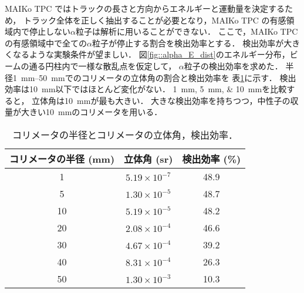 \documentclass[../master]{subfiles}
\begin{document}
MAIKo TPC ではトラックの長さと方向からエネルギーと運動量を決定するため，
トラック全体を正しく抽出することが必要となり，MAIKo TPC の有感領域内で停止しない$\alpha$粒子は解析に用いることができない．
ここで，MAIKo TPC の有感領域中で全ての$\alpha$粒子が停止する割合を検出効率とする．
検出効率が大きくなるような実験条件が望ましい．
図\ref{fig::alpha_E_dist}のエネルギー分布，ビームの通る円柱内で一様な散乱点を仮定して，
$\alpha$粒子の検出効率を求めた．
半径\SIrange{1}{50}{\milli\metre}でのコリメータの立体角の割合と検出効率を
表\ref{tab::solid_angle_percent}に示す．
検出効率は\SI{10}{\milli\metre}以下ではほとんど変化がない．
\SIlist{1;5;10}{\milli\metre}を比較すると，
立体角は\SI{10}{\milli\metre}が最も大きい．
大きな検出効率を持ちつつ，中性子の収量が大きい\SI{10}{\milli\metre}のコリメータを用いる．
\begin{table}
  \centering
  \caption{コリメータの半径とコリメータの立体角，検出効率．}
  \label{tab::solid_angle_percent}
  \begin{tabular}{ccc}
    \toprule
    コリメータの半径 (\si{\milli\metre}) & 立体角 (\si{\steradian}) & 検出効率 (\si{\percent})\\%
    \midrule
     1 & $5.19\times10^{-7}$ & 48.9 \\
     5 & $1.30\times10^{-5}$ & 48.7 \\%
    10 & $5.19\times10^{-5}$ & 48.2 \\%
    20 & $2.08\times10^{-4}$ & 46.6 \\%
    30 & $4.67\times10^{-4}$ & 39.2 \\%
    40 & $8.31\times10^{-4}$ & 26.3 \\%
    50 & $1.30\times10^{-3}$ & 10.3 \\%
    \bottomrule
  \end{tabular}
\end{table}
\end{document}
